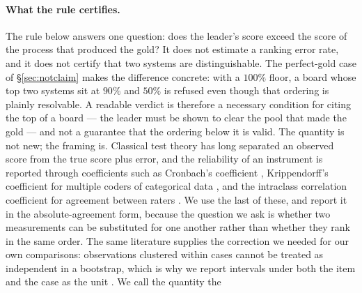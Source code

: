 \documentclass{article}
\begin{document}
\paragraph{What the rule certifies.} The rule below answers one question: does the leader's score exceed the score of the process that produced the gold? It does not estimate a ranking error rate, and it does not certify that two systems are distinguishable. The perfect-gold case of \S\ref{sec:notclaim} makes the difference concrete: with a $100\%$ floor, a board whose top two systems sit at $90\%$ and $50\%$ is refused even though that ordering is plainly resolvable. A readable verdict is therefore a necessary condition for citing the top of a board --- the leader must be shown to clear the pool that made the gold --- and not a guarantee that the ordering below it is valid. The quantity is not new; the framing is. Classical test theory has long separated an observed score from the true score plus error, and the reliability of an instrument is reported through coefficients such as Cronbach's coefficient \cite{cronbach1951}, Krippendorff's coefficient for multiple coders of categorical data \cite{krippendorff2004}, and the intraclass correlation coefficient for agreement between raters \cite{shroutfleiss1979,kooli2016}. We use the last of these, and report it in the absolute-agreement form, because the question we ask is whether two measurements can be substituted for one another rather than whether they rank in the same order. The same literature supplies the correction we needed for our own comparisons: observations clustered within cases cannot be treated as independent in a bootstrap, which is why we report intervals under both the item and the case as the unit \cite{camerongelbachmiller2007}. We call the quantity the
\end{document}
